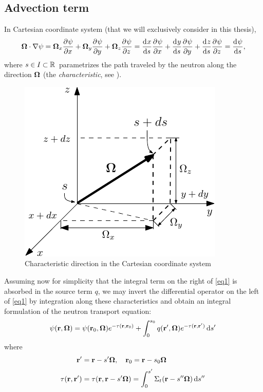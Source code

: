 \subsection{Advection term}\label{sec:advection}
In Cartesian coordinate system (that we will exclusively consider in this thesis),
$$
	\mathbf{\Omega}\cdot\nabla\psi = \mathbf{\Omega}_x\frac{\partial^{}\psi}{\partial x^{}} + \mathbf{\Omega}_y\frac{\partial^{}\psi}{\partial y^{}} + \mathbf{\Omega}_z\frac{\partial^{}\psi}{\partial z^{}} = 
	\frac{\text{d}^{}{x}}{\text{d} {s}^{}}\frac{\partial^{}\psi}{\partial x^{}} + \frac{\text{d}^{}{y}}{\text{d} {s}^{}}\frac{\partial^{}\psi}{\partial y^{}} + \frac{\text{d}^{}{z}}{\text{d} {s}^{}}\frac{\partial^{}\psi}{\partial z^{}} = \frac{\text{d}^{}{\psi}}{\text{d} {s}^{}},
$$
where $s\in I\subset \mathbb{R}^{}$ parametrizes the path traveled by the neutron along the direction $\mathbf{\Omega}$ (the
\textit{characteristic}, see ).
\begin{figure}[htp]
\begin{center}
  \includegraphics[scale=1.2]{cartesian_streaming2}
  \caption{Characteristic direction in the Cartesian coordinate system}
  \label{fig:cartesian2}
\end{center}
\end{figure}
Assuming now for simplicity that the integral term on the right of \eqref{eq1} is absorbed in the source term $q$, we
may invert the differential operator on the left of \eqref{eq1} by integration along these characteristics and obtain an
integral formulation of the neutron transport equation:
\begin{equation}\label{eq:nte-integral}
	\psi(\mathbf{r},\mathbf{\Omega}) = \psi(\mathbf{r}_0,\mathbf{\Omega})e^{-\tau(\mathbf{r},\mathbf{r}_0)} + \int_0^{s_0}
	q(\mathbf{r}',\mathbf{\Omega})e^{-\tau(\mathbf{r},\mathbf{r}')}\,\text{d}s'\,
\end{equation}
where
\begin{align}
	\mathbf{r}' &= \mathbf{r} - s' \mathbf{\Omega}, \quad \mathbf{r}_0 = \mathbf{r} - s_0 \mathbf{\Omega}\nonumber\\[.2em]
	\tau(\mathbf{r},\mathbf{r}') &= \tau(\mathbf{r},\mathbf{r}-s'\mathbf{\Omega}) = \int_0^{s'} \Sigma_t(\mathbf{r} - s''\mathbf{\Omega})\,\text{d}s''\, \label{eq:tau}
\end{align}
